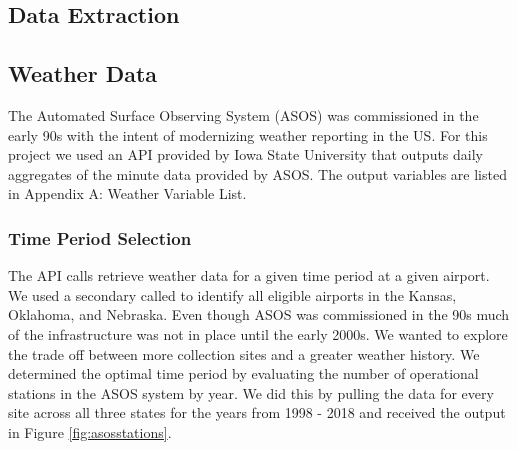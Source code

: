 \documentclass[twoside,11pt]{article}
\begin{document}
%
%
%

\subsection{Data Extraction}

\subsection{Weather Data}
	The Automated Surface Observing System (ASOS) was commissioned in the early 90s with the intent of modernizing weather reporting in the US. For this project we used an API provided by Iowa State University that outputs daily aggregates of the minute data provided by ASOS. The output variables are listed in Appendix A: Weather Variable List.
	
	\subsubsection{Time Period Selection}
	The API calls retrieve weather data for a given time period at a given airport. We used a secondary called to identify all eligible airports in the Kansas, Oklahoma, and Nebraska. Even though ASOS was commissioned in the 90s much of the infrastructure was not in place until the early 2000s. We wanted to explore the trade off between more collection sites and a greater weather history. We determined the optimal time period by evaluating the number of operational stations in the ASOS system by year. We did this by pulling the data for every site across all three states for the years from 1998 - 2018 and received the output in Figure \ref{fig:asosstations}. 
	
\end{document}
